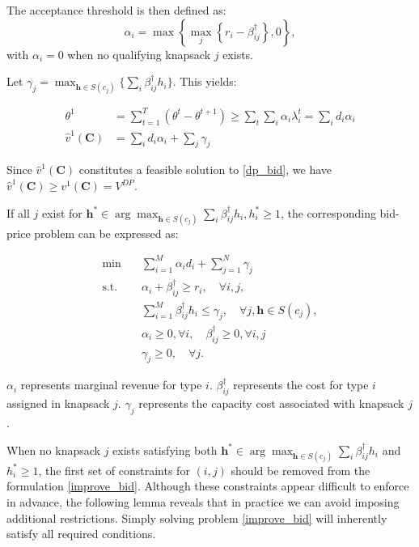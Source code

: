 The acceptance threshold is then defined as:
$$\alpha_{i} = \max\left\{\max_{j}\left\{r_i - \beta_{ij}^{\dag} \right\}, 0\right\},$$ 
with $\alpha_{i} = 0$ when no qualifying knapsack $j$ exists.

Let $\gamma_{j} = \max_{\bm{h} \in S(c_{j})} \{\sum_{i} \beta_{ij}^{\dag} h_{i}\}$. This yields:

\begin{align*}
    \theta^{1} & = \sum_{t=1}^{T} (\theta^{t} - \theta^{t+1}) \geq \sum_{t} \sum_{i} \alpha_{i} \lambda_{i}^{t} = \sum_{i} d_{i} \alpha_{i} \\
    \hat{v}^{1}(\bm{C}) & = \sum_{i} d_{i} \alpha_{i} + \sum_{j} \gamma_{j}
\end{align*}

Since $\hat{v}^{1}(\bm{C})$ constitutes a feasible solution to \eqref{dp_bid}, we have $\hat{v}^{1}(\bm{C}) \geq v^{1}(\bm{C}) =  V^{DP}$.

If all $j$ exist for $\bm{h}^{*} \in \arg\max_{\bm{h} \in S(c_j)} \sum_{i} \beta_{ij}^{\dag} h_{i}, h_{i}^{*} \geq 1$, the corresponding bid-price problem can be expressed as:

\begin{equation}\label{improve_bid}
    \begin{aligned}
    \min \quad & \sum_{i=1}^M \alpha_i d_i+ \sum_{j=1}^N \gamma_j \\
    \mathrm{s.t.} \quad & \alpha_i+ \beta_{ij}^{\dag} \geq r_i, \quad \forall i, j, \\
    & \sum_{i=1}^M \beta_{ij}^{\dag} h_i \leq \gamma_j, \quad \forall j, \bm{h} \in S(c_j), \\
    & \alpha_i \geq 0, \forall i, \quad \beta_{ij}^{\dag} \geq 0, \forall i, j \\
    & \gamma_j \geq 0, \quad \forall j.
    \end{aligned}
\end{equation}

$\alpha_{i}$ represents marginal revenue for type $i$. $\beta_{ij}^{\dag}$ represents the cost for type $i$ assigned in knapsack $j$. $\gamma_{j}$ represents the capacity cost associated with knapsack $j$.

When no knapsack $j$ exists satisfying both $\bm{h}^{*} \in \arg\max_{\bm{h} \in S(c_j)} \sum_{i} \beta_{ij}^{\dag} h_{i}$ and $h_{i}^{*} \geq 1$, the first set of constraints for $(i,j)$ should be removed from the formulation \eqref{improve_bid}. Although these constraints appear difficult to enforce in advance, the following lemma reveals that in practice we can avoid imposing additional restrictions. Simply solving problem \eqref{improve_bid} will inherently satisfy all required conditions.

